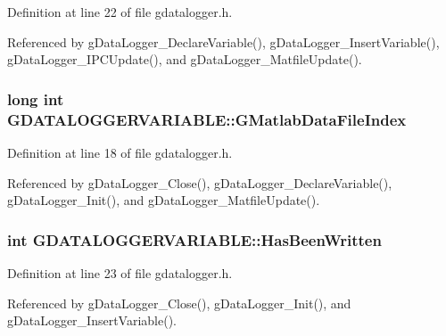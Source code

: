 Definition at line 22 of file gdatalogger.\-h.



Referenced by g\-Data\-Logger\-\_\-\-Declare\-Variable(), g\-Data\-Logger\-\_\-\-Insert\-Variable(), g\-Data\-Logger\-\_\-\-I\-P\-C\-Update(), and g\-Data\-Logger\-\_\-\-Matfile\-Update().

\hypertarget{structGDATALOGGERVARIABLE_aa1cd5b838d8655734e7d4499b25bf22a}{
\subsubsection[{G\-Matlab\-Data\-File\-Index}]{\setlength{\rightskip}{0pt plus 5cm}long int G\-D\-A\-T\-A\-L\-O\-G\-G\-E\-R\-V\-A\-R\-I\-A\-B\-L\-E\-::\-G\-Matlab\-Data\-File\-Index}}\label{structGDATALOGGERVARIABLE_aa1cd5b838d8655734e7d4499b25bf22a}


Definition at line 18 of file gdatalogger.\-h.



Referenced by g\-Data\-Logger\-\_\-\-Close(), g\-Data\-Logger\-\_\-\-Declare\-Variable(), g\-Data\-Logger\-\_\-\-Init(), and g\-Data\-Logger\-\_\-\-Matfile\-Update().

\hypertarget{structGDATALOGGERVARIABLE_ad982aef10e8496c2a1c6b9bb1f1dc5c3}{
\subsubsection[{Has\-Been\-Written}]{\setlength{\rightskip}{0pt plus 5cm}int G\-D\-A\-T\-A\-L\-O\-G\-G\-E\-R\-V\-A\-R\-I\-A\-B\-L\-E\-::\-Has\-Been\-Written}}\label{structGDATALOGGERVARIABLE_ad982aef10e8496c2a1c6b9bb1f1dc5c3}


Definition at line 23 of file gdatalogger.\-h.



Referenced by g\-Data\-Logger\-\_\-\-Close(), g\-Data\-Logger\-\_\-\-Init(), and g\-Data\-Logger\-\_\-\-Insert\-Variable().

